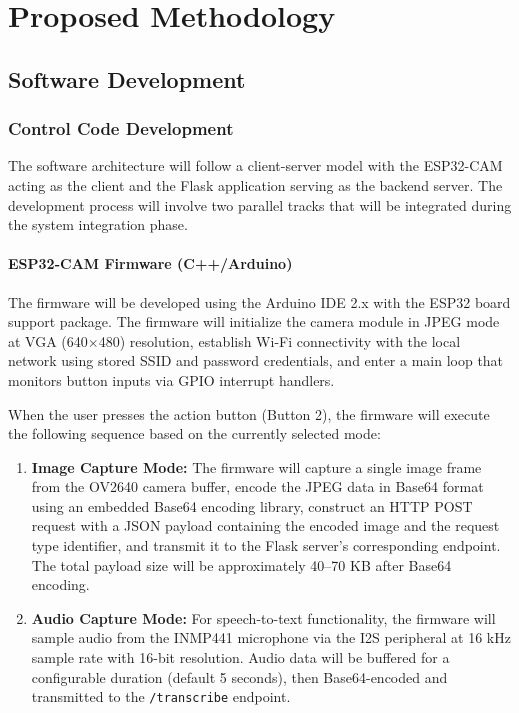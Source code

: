 \chapter{Proposed Methodology}

\section{Software Development}

\subsection{Control Code Development}
The software architecture will follow a client-server model with the ESP32-CAM acting as the client and the Flask application serving as the backend server. The development process will involve two parallel tracks that will be integrated during the system integration phase.

\subsubsection*{ESP32-CAM Firmware (C++/Arduino)}
The firmware will be developed using the Arduino IDE 2.x with the ESP32 board support package. The firmware will initialize the camera module in JPEG mode at VGA (640$\times$480) resolution, establish Wi-Fi connectivity with the local network using stored SSID and password credentials, and enter a main loop that monitors button inputs via GPIO interrupt handlers.

When the user presses the action button (Button 2), the firmware will execute the following sequence based on the currently selected mode:

\begin{enumerate}[leftmargin=1.5cm]
\item \textbf{Image Capture Mode:} The firmware will capture a single image frame from the OV2640 camera buffer, encode the JPEG data in Base64 format using an embedded Base64 encoding library, construct an HTTP POST request with a JSON payload containing the encoded image and the request type identifier, and transmit it to the Flask server's corresponding endpoint. The total payload size will be approximately 40--70 KB after Base64 encoding.

\item \textbf{Audio Capture Mode:} For speech-to-text functionality, the firmware will sample audio from the INMP441 microphone via the I2S peripheral at 16 kHz sample rate with 16-bit resolution. Audio data will be buffered for a configurable duration (default 5 seconds), then Base64-encoded and transmitted to the \texttt{/transcribe} endpoint.
\end{enumerate}

